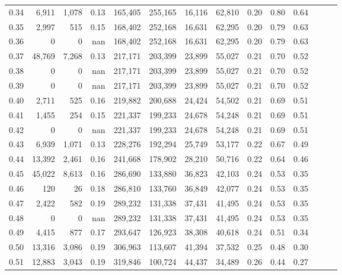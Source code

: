 \begin{tabular}{rrrrrrrrrrrrrr}
0.34 &   6,911 &  1,078 &  0.13 &  165,405 &  255,165 &  16,116 &  62,810 &  0.20 &  0.80 &      0.64 \\
0.35 &   2,997 &    515 &  0.15 &  168,402 &  252,168 &  16,631 &  62,295 &  0.20 &  0.79 &      0.63 \\
0.36 &       0 &      0 &   nan &  168,402 &  252,168 &  16,631 &  62,295 &  0.20 &  0.79 &      0.63 \\
0.37 &  48,769 &  7,268 &  0.13 &  217,171 &  203,399 &  23,899 &  55,027 &  0.21 &  0.70 &      0.52 \\
0.38 &       0 &      0 &   nan &  217,171 &  203,399 &  23,899 &  55,027 &  0.21 &  0.70 &      0.52 \\
0.39 &       0 &      0 &   nan &  217,171 &  203,399 &  23,899 &  55,027 &  0.21 &  0.70 &      0.52 \\
0.40 &   2,711 &    525 &  0.16 &  219,882 &  200,688 &  24,424 &  54,502 &  0.21 &  0.69 &      0.51 \\
0.41 &   1,455 &    254 &  0.15 &  221,337 &  199,233 &  24,678 &  54,248 &  0.21 &  0.69 &      0.51 \\
0.42 &       0 &      0 &   nan &  221,337 &  199,233 &  24,678 &  54,248 &  0.21 &  0.69 &      0.51 \\
0.43 &   6,939 &  1,071 &  0.13 &  228,276 &  192,294 &  25,749 &  53,177 &  0.22 &  0.67 &      0.49 \\
0.44 &  13,392 &  2,461 &  0.16 &  241,668 &  178,902 &  28,210 &  50,716 &  0.22 &  0.64 &      0.46 \\
0.45 &  45,022 &  8,613 &  0.16 &  286,690 &  133,880 &  36,823 &  42,103 &  0.24 &  0.53 &      0.35 \\
0.46 &     120 &     26 &  0.18 &  286,810 &  133,760 &  36,849 &  42,077 &  0.24 &  0.53 &      0.35 \\
0.47 &   2,422 &    582 &  0.19 &  289,232 &  131,338 &  37,431 &  41,495 &  0.24 &  0.53 &      0.35 \\
0.48 &       0 &      0 &   nan &  289,232 &  131,338 &  37,431 &  41,495 &  0.24 &  0.53 &      0.35 \\
0.49 &   4,415 &    877 &  0.17 &  293,647 &  126,923 &  38,308 &  40,618 &  0.24 &  0.51 &      0.34 \\
0.50 &  13,316 &  3,086 &  0.19 &  306,963 &  113,607 &  41,394 &  37,532 &  0.25 &  0.48 &      0.30 \\
0.51 &  12,883 &  3,043 &  0.19 &  319,846 &  100,724 &  44,437 &  34,489 &  0.26 &  0.44 &      0.27 \\

\end{tabular}
